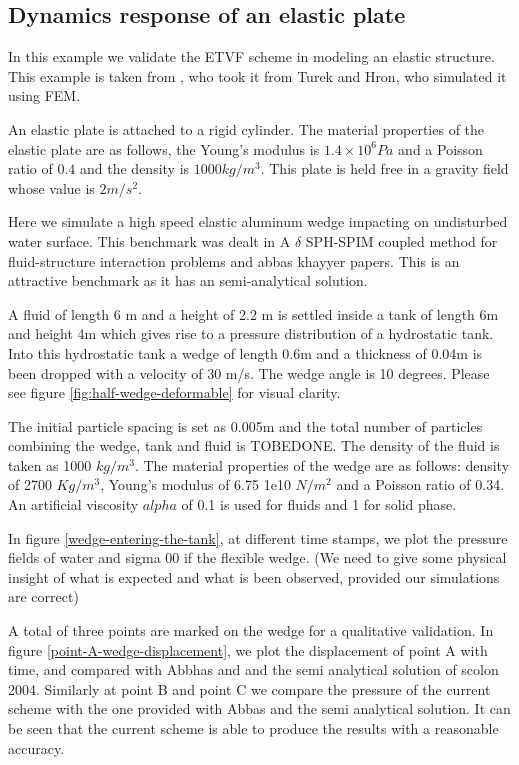 \documentclass[preprint,12pt]{elsarticle}
\begin{document}
\subsection{Dynamics response of an elastic plate}
\label{sec:elastic-plate}

In this example we validate the ETVF scheme in modeling an elastic structure.
This example is taken from \cite{Sun2019study}, who took it from Turek and
Hron, who simulated it using FEM.

An elastic plate is attached to a rigid cylinder. The material properties of
the elastic plate are as follows, the Young's modulus is $1.4\times10^6Pa$ and
a Poisson ratio of $0.4$ and the density is $1000 kg/m^3$. This plate is held
free in a gravity field whose value is $2m/s^2$.


Here we simulate a high speed elastic aluminum wedge impacting on undisturbed
water surface. This benchmark was dealt in
{A $\delta$ SPH-SPIM coupled method for fluid-structure interaction problems} and
{abbas khayyer} papers.
This is an attractive benchmark as it has an semi-analytical solution.

A fluid of length 6 m and a height of 2.2 m is settled inside a tank of length
6m and height 4m which gives rise to a pressure distribution of a hydrostatic
tank. Into this hydrostatic tank a wedge of length 0.6m and a thickness of
0.04m is been dropped with a velocity of 30 m/s. The wedge angle is 10
degrees. Please see figure \ref{fig:half-wedge-deformable} for visual clarity.

The initial particle spacing is set as 0.005m and the total number of
particles combining the wedge, tank and fluid is TOBEDONE. The density of the
fluid is taken as 1000 $kg/m^3$. The material properties of the wedge are as
follows: density of 2700 $Kg/m^3$, Young's modulus of 6.75 1e10 $N/m^2$ and a
Poisson ratio of 0.34. An artificial viscosity $alpha$ of 0.1 is used for
fluids and 1 for solid phase.

In figure \ref{wedge-entering-the-tank}, at different time stamps, we plot the
pressure fields of water and sigma 00 if the flexible wedge. (We need to give
some physical insight of what is expected and what is been observed, provided
our simulations are correct)



A total of three points are marked on the wedge for a qualitative validation.
In figure \ref{point-A-wedge-displacement}, we plot the displacement of point
A with time, and compared with Abbhas and and the semi analytical solution of
scolon 2004. Similarly at point B and point C we compare the pressure of the
current scheme with the one provided with Abbas and the semi analytical
solution. It can be seen that the current scheme is able to produce the
results with a reasonable accuracy.
\end{document}
